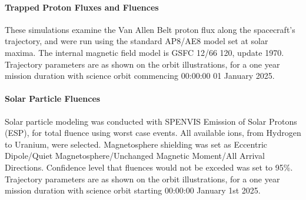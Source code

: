 \documentclass[11pt]{article}
\begin{document}
\paragraph{Trapped Proton Fluxes and Fluences}
These simulations examine the Van Allen Belt proton flux along the spacecraft's trajectory, and were run using the standard AP8/AE8 model set at solar maxima. The internal magnetic field model is GSFC 12/66 120, update 1970.\cite{website:spenvis01} Trajectory parameters are as shown on the orbit illustrations, for a one year mission duration with science orbit commencing 00:00:00 01 January 2025.

\paragraph{Solar Particle Fluences}
Solar particle modeling was conducted with SPENVIS Emission of Solar Protons (ESP), for total fluence using worst case events.\cite{website:spenvis02} All available ions, from Hydrogen to Uranium, were selected. Magnetosphere shielding was set as Eccentric Dipole/Quiet Magnetosphere/Unchanged Magnetic Moment/All Arrival Directions. Confidence level that fluences would not be exceded was set to 95\%. Trajectory parameters are as shown on the orbit illustrations, for a one year mission duration with science orbit starting 00:00:00 January 1st 2025.
\end{document}
